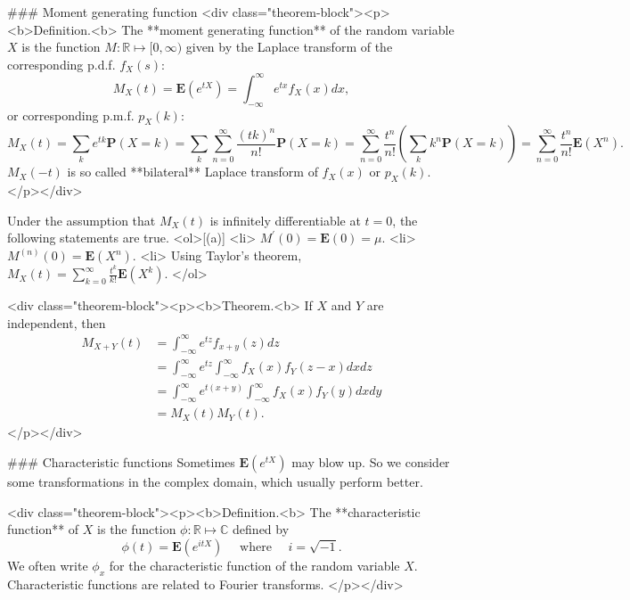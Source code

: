 ### Moment generating function
<div class="theorem-block"><p><b>Definition.<b> 
The **moment generating function** of the random variable $X$ is the function $M: \mathbb{R} \mapsto [0, \infty)$ given by the Laplace transform of the corresponding p.d.f. $f_X(s)$:
$$\begin{equation}
    M_X(t) = \mathbf{E} \left( e^{tX} \right) = \int_{-\infty}^\infty e^{tx} f_X(x) dx,
\end{equation}$$
or corresponding p.m.f. $p_X(k)$:
$$\begin{equation}
    M_X(t) = \sum_{k} e^{t k} \mathbf{P}(X=k) 
    = \sum_k \sum_{n=0}^{\infty} \frac{(t k)^{n}}{n !} \mathbf{P}(X=k)
    = \sum_{n=0}^{\infty} \frac{t^{n}}{n !}\left(\sum_k k^{n} \mathbf{P}(X=k)\right) 
    = \sum_{n=0}^{\infty} \frac{t^{n}}{n !} \mathbf{E}\left(X^{n}\right).
\end{equation}$$
$M_X(-t)$ is so called **bilateral** Laplace transform of $f_X(x)$ or $p_X(k)$.
</p></div>

Under the assumption that $M_X(t)$ is infinitely differentiable at $t=0$, the following statements are true. 
<ol>[(a)]
    <li> $M^\prime(0) = \mathbf{E}(0) = \mu$.
    <li> $M^{(n)}(0) = \mathbf{E}(X^n)$.
    <li> Using Taylor's theorem, $M_X(t) = \sum_{k=0}^\infty \frac{t^k}{k!} \mathbf{E}(X^k)$.
</ol>

<div class="theorem-block"><p><b>Theorem.<b> 
If $X$ and $Y$ are independent, then
$$\begin{equation}
    \begin{split}
        M_{X+Y}(t) &= \int_{-\infty}^\infty e^{tz} f_{x+y}(z) dz \\
        &= \int_{-\infty}^\infty e^{tz} \int_{-\infty}^\infty f_X(x) f_Y(z-x) dx dz \\
        &= \int_{-\infty}^\infty e^{t(x+y)} \int_{-\infty}^\infty f_X(x) f_Y(y) dx dy \\
        &= M_X(t) M_Y(t).
    \end{split}
\end{equation}$$
</p></div>

### Characteristic functions
Sometimes $\mathbf{E}(e^{tX})$ may blow up. So we consider some transformations in the complex domain, which usually perform better.

<div class="theorem-block"><p><b>Definition.<b> 
The **characteristic function** of $X$ is the function $\phi: \mathbb{R} \mapsto \mathbb{C}$ defined by
$$\begin{equation}
    \phi(t)=\mathbf{E}\left(e^{i t X}\right) \quad \text { where } \quad i=\sqrt{-1}.
\end{equation}$$
We often write $\phi_x$ for the characteristic function of the random variable $X$. Characteristic functions are related to Fourier transforms. 
</p></div>

